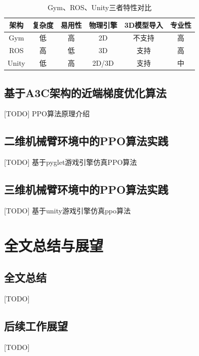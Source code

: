 \documentclass[bachelor]{thesis-uestc}
\begin{document}
	\begin{table}[h]
		\caption{Gym、ROS、Unity三者特性对比}
		\label{compare}
		\begin{tabular}{|c|c|c|c|c|c|}
			\hline
			架构 & 复杂度 & 易用性 & 物理引擎 & 3D模型导入 & 专业性 \\
			\hline
			Gym & 低 & 高 & 2D & 不支持 & 高 \\
			\hline
			ROS & 高 & 低 & 3D & 支持 & 高 \\
			\hline
			Unity & 低 & 高 & 2D/3D & 支持 & 中 \\
			\hline
		\end{tabular}
	\end{table}

	\section{基于A3C架构的近端梯度优化算法}
	[TODO] PPO算法原理介绍
	
	\section{二维机械臂环境中的PPO算法实践}
	[TODO] 基于pyglet游戏引擎仿真PPO算法
	
	\section{三维机械臂环境中的PPO算法实践}
	[TODO] 基于unity游戏引擎仿真ppo算法
	
	\chapter{全文总结与展望}
	
	\section{全文总结}
	[TODO]
	
	\section{后续工作展望}
	[TODO]
	
	\thesisacknowledgement
	[TODO]
	
	
	
	
\end{document}
